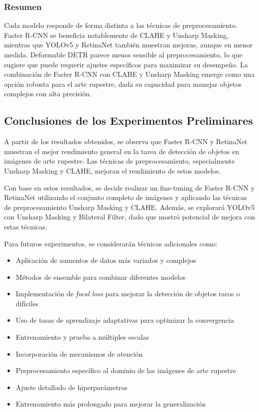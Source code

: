\subsubsection*{Resumen}
Cada modelo responde de forma distinta a las técnicas de preprocesamiento. Faster R-CNN se beneficia notablemente de CLAHE y Unsharp Masking, mientras que YOLOv5 y RetinaNet también muestran mejoras, aunque en menor medida. Deformable DETR parece menos sensible al preprocesamiento, lo que sugiere que puede requerir ajustes específicos para maximizar su desempeño. La combinación de Faster R-CNN con CLAHE y Unsharp Masking emerge como una opción robusta para el arte rupestre, dada su capacidad para manejar objetos complejos con alta precisión.

\subsection{Conclusiones de los Experimentos Preliminares}
A partir de los resultados obtenidos, se observa que Faster R-CNN y RetinaNet muestran el mejor rendimiento general en la tarea de detección de objetos en imágenes de arte rupestre. Las técnicas de preprocesamiento, especialmente Unsharp Masking y CLAHE, mejoran el rendimiento de estos modelos.

Con base en estos resultados, se decide realizar un fine-tuning de Faster R-CNN y RetinaNet utilizando el conjunto completo de imágenes y aplicando las técnicas de preprocesamiento Unsharp Masking y CLAHE. Además, se explorará YOLOv5 con Unsharp Masking y Bilateral Filter, dado que mostró potencial de mejora con estas técnicas.

Para futuros experimentos, se considerarán técnicas adicionales como:
\begin{itemize}
    \item Aplicación de aumentos de datos más variados y complejos
    \item Métodos de ensemble para combinar diferentes modelos
    \item Implementación de \textit{focal loss} para mejorar la detección de objetos raros o difíciles
    \item Uso de tasas de aprendizaje adaptativas para optimizar la convergencia
    \item Entrenamiento y prueba a múltiples escalas
    \item Incorporación de mecanismos de atención
    \item Preprocesamiento específico al dominio de las imágenes de arte rupestre
    \item Ajuste detallado de hiperparámetros
    \item Entrenamiento más prolongado para mejorar la generalización
\end{itemize}

